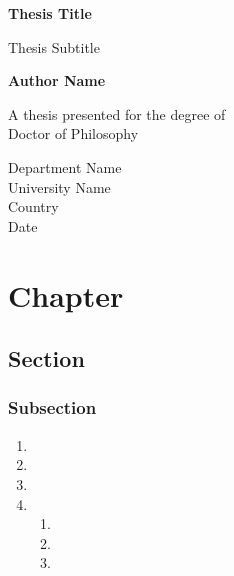 \documentclass[draft,xelatex]{G7-32-2017}
\begin{document}
\begin{titlepage}
    \begin{center}
        \vspace*{1cm}

        \textbf{Thesis Title}

        \vspace{0.5cm}
            Thesis Subtitle
                
        \vspace{1.5cm}

        \textbf{Author Name}

        \vfill
                
        A thesis presented for the degree of\\
        Doctor of Philosophy
                
        \vspace{0.8cm}
                
        Department Name\\
        University Name\\
        Country\\
        Date
    \end{center}
\end{titlepage}

\frontmatter

\tableofcontents

\Introduction

\lipsum[1-4]

\mainmatter

\chapter{Chapter}

\section{Section}

\subsection{Subsection}

\lipsum

\begin{enumerate}
    \item \lipsum[1][1-2]
    \item \lipsum[1][3-4]
    \item \lipsum[1][5-6]
    \item 
    \begin{enumerate}
        \item \lipsum[2][1]
        \item \lipsum[2][2]
        \item \lipsum[2][3]
    \end{enumerate}
\end{enumerate}
\end{document}
